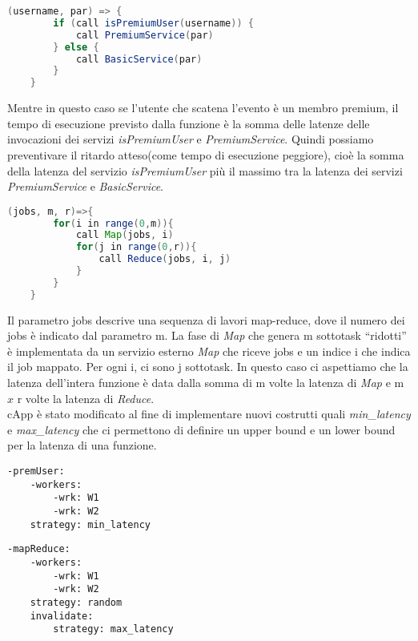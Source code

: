 \documentclass[../../main.tex]{subfiles}
\begin{document}
\begin{lstlisting}[language=Java, caption= La guardia della condizione è un'invocazione a un servizio esterno,label={lst:2}]
    (username, par) => {
        if (call isPremiumUser(username)) {
            call PremiumService(par)
        } else {
            call BasicService(par)
        }
    }
\end{lstlisting}

Mentre in questo caso se l'utente che scatena l'evento è un membro premium, il tempo di esecuzione previsto dalla funzione è la somma delle latenze delle invocazioni dei servizi \textit{isPremiumUser} e \textit{PremiumService}.
Quindi possiamo preventivare il ritardo atteso(come tempo di esecuzione peggiore), cioè la somma della latenza del servizio \textit{isPremiumUser} più il massimo tra la latenza dei servizi \textit{PremiumService} e \textit{BasicService}.

\begin{lstlisting}[language=Java, caption=Funzione con logica Map-Reduce,label={lst:3}]
    (jobs, m, r)=>{
        for(i in range(0,m)){
            call Map(jobs, i)
            for(j in range(0,r)){
                call Reduce(jobs, i, j)
            }
        }
    }
\end{lstlisting}
Il parametro jobs descrive una sequenza di lavori map-reduce, dove il numero dei jobs è indicato dal parametro m.
La fase di \textit{Map} che genera m sottotask ``ridotti'' è implementata da un servizio esterno \textit{Map} che riceve jobs e un indice i che indica il job mappato.
Per ogni i, ci sono j sottotask.
In questo caso ci aspettiamo che la latenza dell'intera funzione è data dalla somma di m volte la latenza di \textit{Map} e m $x$ r volte la latenza di \textit{Reduce}.\\

cApp è stato modificato al fine di implementare nuovi costrutti quali \textit{min\_latency} e \textit{max\_latency} che ci permettono di definire un upper bound e un lower bound per la latenza di una funzione.
\begin{multicols}{2}
    \begin{lstlisting}[caption={cAPP for Listing \ref{lst:1} e \ref{lst:2}},label={lst:4}]
-premUser:
    -workers:
        -wrk: W1
        -wrk: W2
    strategy: min_latency
    \end{lstlisting}
    \columnbreak
    \begin{lstlisting}[caption={cApp for Listing~\ref{lst:3}}, label={lst:5}]
-mapReduce:
    -workers:
        -wrk: W1
        -wrk: W2
    strategy: random
    invalidate:
        strategy: max_latency
    \end{lstlisting}
\end{multicols}
\end{document}
